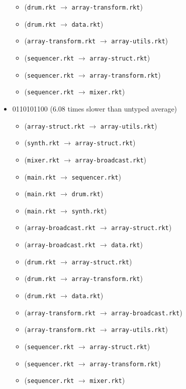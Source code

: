 \documentclass{article}
\newcommand{\mono}[1]{\texttt{#1}}
\begin{document}
\begin{itemize}
\begin{itemize}
  \item (\mono{drum.rkt} $\rightarrow$ \mono{array-transform.rkt})
  \item (\mono{drum.rkt} $\rightarrow$ \mono{data.rkt})
  \item (\mono{array-transform.rkt} $\rightarrow$ \mono{array-utils.rkt})
  \item (\mono{sequencer.rkt} $\rightarrow$ \mono{array-struct.rkt})
  \item (\mono{sequencer.rkt} $\rightarrow$ \mono{array-transform.rkt})
  \item (\mono{sequencer.rkt} $\rightarrow$ \mono{mixer.rkt})
  \end{itemize}
\item 0110101100 (6.08 times slower than untyped average)
  \begin{itemize}
  \item (\mono{array-struct.rkt} $\rightarrow$ \mono{array-utils.rkt})
  \item (\mono{synth.rkt} $\rightarrow$ \mono{array-struct.rkt})
  \item (\mono{mixer.rkt} $\rightarrow$ \mono{array-broadcast.rkt})
  \item (\mono{main.rkt} $\rightarrow$ \mono{sequencer.rkt})
  \item (\mono{main.rkt} $\rightarrow$ \mono{drum.rkt})
  \item (\mono{main.rkt} $\rightarrow$ \mono{synth.rkt})
  \item (\mono{array-broadcast.rkt} $\rightarrow$ \mono{array-struct.rkt})
  \item (\mono{array-broadcast.rkt} $\rightarrow$ \mono{data.rkt})
  \item (\mono{drum.rkt} $\rightarrow$ \mono{array-struct.rkt})
  \item (\mono{drum.rkt} $\rightarrow$ \mono{array-transform.rkt})
  \item (\mono{drum.rkt} $\rightarrow$ \mono{data.rkt})
  \item (\mono{array-transform.rkt} $\rightarrow$ \mono{array-broadcast.rkt})
  \item (\mono{array-transform.rkt} $\rightarrow$ \mono{array-utils.rkt})
  \item (\mono{sequencer.rkt} $\rightarrow$ \mono{array-struct.rkt})
  \item (\mono{sequencer.rkt} $\rightarrow$ \mono{array-transform.rkt})
  \item (\mono{sequencer.rkt} $\rightarrow$ \mono{mixer.rkt})
  \end{itemize}

\end{itemize}
\end{document}
